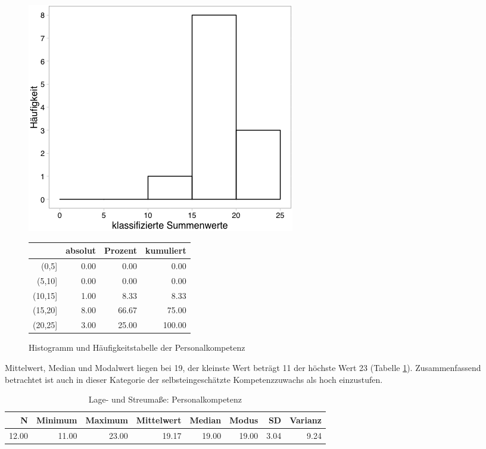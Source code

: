 \documentclass[12pt, bibliography=totoc]{scrartcl}
\begin{document}
\begin{figure}[H]
\begin{minipage}{.4\linewidth}
\includegraphics[width=0.8\linewidth]{Anhang/PKHistnn.png}

\end{minipage}
\begin{minipage}{.4\linewidth}
\centering
\raisebox{\depth}
{\begin{tabular}{rrrr}
  \hline
 & absolut & Prozent & kumuliert \\
  \hline
(0,5] & 0.00 & 0.00 & 0.00 \\
  (5,10] & 0.00 & 0.00 & 0.00 \\
  (10,15] & 1.00 & 8.33 & 8.33 \\
  (15,20] & 8.00 & 66.67 & 75.00 \\
  (20,25] & 3.00 & 25.00 & 100.00 \\
   \hline
\end{tabular}

}
\label{tab:defis}
\end{minipage}
\caption{Histogramm und Häufigkeitstabelle der Personalkompetenz}
\label{fig:PK}
\end{figure}

Mittelwert, Median und Modalwert liegen bei 19, der kleinste Wert
beträgt 11 der höchste Wert 23 (Tabelle \ref{tab:lPK}). Zusammenfassend
betrachtet ist auch in dieser Kategorie der selbsteingeschätzte
Kompetenzzuwachs als hoch einzustufen.

\begin{table}[H]
\centering
\caption{Lage- und Streumaße: Personalkompetenz}
\label{tab:lPK}
\begin{tabular}{rrrrrrrr}
  \hline
  N & Minimum & Maximum & Mittelwert & Median & Modus & SD & Varianz \\
  \hline
  12.00 & 11.00 & 23.00 & 19.17 & 19.00 & 19.00 & 3.04 & 9.24 \\
   \hline
\end{tabular}
\end{table}
\end{document}
